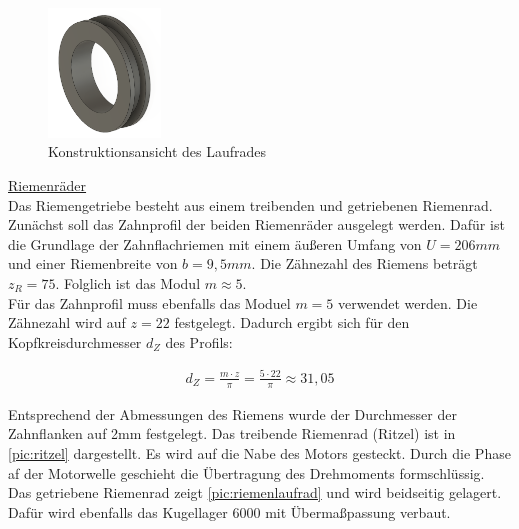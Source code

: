 \begin{figure}[h]
	\centering
	\includegraphics[width=3cm]{laufrad.png}
	\caption{Konstruktionsansicht des Laufrades}
	\label{pic:laufrad}
\end{figure}

\underline{Riemenräder}\\   
Das Riemengetriebe besteht aus einem treibenden und getriebenen Riemenrad. Zunächst soll das Zahnprofil der beiden Riemenräder ausgelegt werden. Dafür ist die Grundlage der Zahnflachriemen mit einem äußeren Umfang von $U = 206mm$ und einer Riemenbreite von $b=9,5mm$. Die Zähnezahl des Riemens beträgt $z_R=75$. Folglich ist das Modul $m \approx 5$. \\

 Für das Zahnprofil muss ebenfalls das Moduel $m=5$ verwendet werden. Die Zähnezahl wird auf $z=22$ festgelegt. Dadurch ergibt sich für den Kopfkreisdurchmesser $d_Z$ des Profils: 
 
 \begin{align}
 	d_Z =  \frac{m \cdot z}{\pi} = \frac{5 \cdot 22}{\pi} \approx 31,05 
 \end{align}


Entsprechend der Abmessungen des Riemens wurde der Durchmesser der Zahnflanken auf 2mm festgelegt.  Das treibende Riemenrad (Ritzel) ist in \autoref{pic:ritzel} dargestellt. Es wird auf die Nabe des Motors gesteckt. Durch die Phase af der Motorwelle geschieht die Übertragung des Drehmoments formschlüssig.  Das getriebene Riemenrad zeigt \autoref{pic:riemenlaufrad} und wird beidseitig gelagert. Dafür wird ebenfalls das Kugellager 6000 mit Übermaßpassung verbaut.  
 

